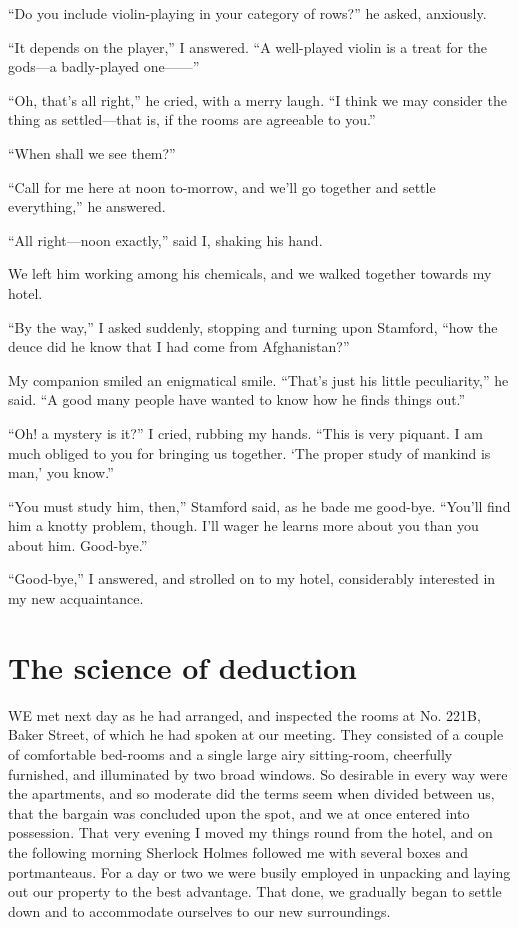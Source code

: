 \documentclass[12pt]{book}
\begin{document}
“Do you include violin-playing in your category of rows?” he asked, anxiously. 

“It depends on the player,” I answered. “A well-played violin is a treat for the gods—a badly-played one——” 

“Oh, that’s all right,” he cried, with a merry laugh. “I think we may consider the thing as settled—that is, if the rooms are agreeable to you.” 

“When shall we see them?” 

“Call for me here at noon to-morrow, and we’ll go together and settle everything,” he answered. 

“All right—noon exactly,” said I, shaking his hand. 

We left him working among his chemicals, and we walked together towards my hotel. 

“By the way,” I asked suddenly, stopping and turning upon Stamford, “how the deuce did he know that I had come from Afghanistan?” 

My companion smiled an enigmatical smile. “That’s just his little peculiarity,” he said. “A good many people have wanted to know how he finds things out.” 

“Oh! a mystery is it?” I cried, rubbing my hands. “This is very piquant. I am much obliged to you for bringing us together. ‘The proper study of mankind is man,’ you know.” 

“You must study him, then,” Stamford said, as he bade me good-bye. “You’ll find him a knotty problem, though. I’ll wager he learns more about you than you about him. Good-bye.” 

“Good-bye,” I answered, and strolled on to my hotel, considerably interested in my new acquaintance. 







\chapter{The science of deduction} 

WE met next day as he had arranged, and inspected the rooms at No. 221B, Baker Street, of which he had spoken at our meeting. They consisted of a couple of comfortable bed-rooms and a single large airy sitting-room, cheerfully furnished, and illuminated by two broad windows. So desirable in every way were the apartments, and so moderate did the terms seem when divided between us, that the bargain was concluded upon the spot, and we at once entered into possession. That very evening I moved my things round from the hotel, and on the following morning Sherlock Holmes followed me with several boxes and portmanteaus. For a day or two we were busily employed in unpacking and laying out our property to the best advantage. That done, we gradually began to settle down and to accommodate ourselves to our new surroundings. 
\end{document}
